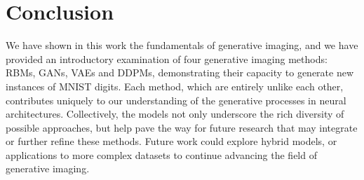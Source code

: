 \documentclass{article}
\begin{document}
\section{Conclusion}
We have shown in this work the fundamentals of generative imaging, and we have provided an introductory examination of four generative imaging methods: RBMs, GANs, VAEs and DDPMs, demonstrating their capacity to generate new instances of MNIST digits. Each method, which are entirely unlike each other, contributes uniquely to our understanding of the generative processes in neural architectures. Collectively, the models not only underscore the rich diversity of possible approaches, but help pave the way for future research that may integrate or further refine these methods. Future work could explore hybrid models, or applications to more complex datasets to continue advancing the field of generative imaging.
\newpage


\newpage
\end{document}
